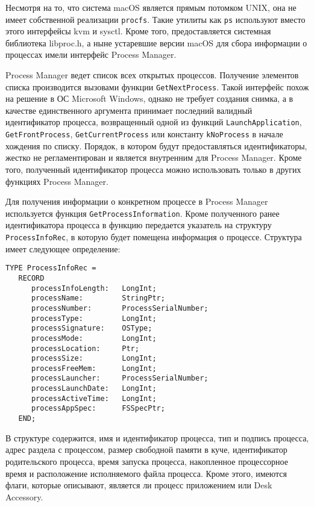 Несмотря на то, что система macOS является прямым потомком UNIX, она не имеет
собственной реализации \texttt{procfs}. Такие утилиты как \texttt{ps} используют
вместо этого интерфейсы kvm и sysctl\cite{osxproc}. Кроме того, предоставляется
системная библиотека libproc.h, а ныне устаревшие версии macOS для сбора
информации о процессах имели интерфейс Process Manager.

Process Manager ведет список всех открытых процессов\cite{procmanag}. Получение
элементов списка производится вызовами функции \texttt{GetNextProcess}. Такой
интерфейс похож на решение в ОС Microsoft Windows, однако не требует создания
снимка, а в качестве единственного аргумента принимает последний валидный
идентификатор процесса, возвращенный одной из функций %
\texttt{LaunchApplication}, \texttt{GetFrontProcess}, \texttt{GetCurrentProcess}
или константу \texttt{kNoProcess} в начале хождения по списку. Порядок, в
котором будут предоставляться идентификаторы, жестко не регламентирован и
является внутренним для Process Manager. Кроме того, полученный идентификатор
процесса можно использовать только в других функциях Process Manager.

Для получения информации о конкретном процессе в Process Manager используется
функция \texttt{GetProcessInformation}. Кроме полученного ранее идентификатора
процесса в функцию передается указатель на структуру \texttt{ProcessInfoRec}, в
которую будет помещена информация о процессе. Структура имеет следующее
определение:

\medskip
\begin{lstlisting}[style=cstyle]
TYPE ProcessInfoRec =
   RECORD
      processInfoLength:   LongInt;
      processName:         StringPtr;
      processNumber:       ProcessSerialNumber;
      processType:         LongInt;
      processSignature:    OSType;
      processMode:         LongInt;
      processLocation:     Ptr;
      processSize:         LongInt;
      processFreeMem:      LongInt;
      processLauncher:     ProcessSerialNumber;
      processLaunchDate:   LongInt;
      processActiveTime:   LongInt;
      processAppSpec:      FSSpecPtr;
   END;
\end{lstlisting}
\medskip

В структуре содержится, имя и идентификатор процесса, тип и подпись процесса,
адрес раздела с процессом, размер свободной памяти в куче, идентификатор
родительского процесса, время запуска процесса, накопленное процессорное время и
расположение исполняемого файла процесса. Кроме этого, имеются флаги, которые
описывают, является ли процесс приложением или Desk Accessory.

